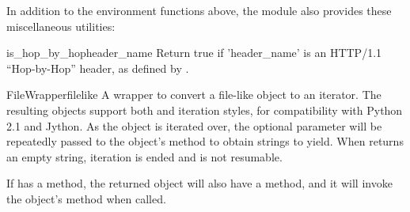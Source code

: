 In addition to the environment functions above, the
 module also provides these miscellaneous
utilities:

\begin{funcdesc}{is_hop_by_hop}{header_name}
Return true if 'header_name' is an HTTP/1.1 ``Hop-by-Hop'' header, as
defined by .
\end{funcdesc}

\begin{classdesc}{FileWrapper}{filelike }
A wrapper to convert a file-like object to an iterator.  The resulting
objects support both  and 
iteration styles, for compatibility with Python 2.1 and Jython.
As the object is iterated over, the optional  parameter
will be repeatedly passed to the  object's 
method to obtain strings to yield.  When  returns an
empty string, iteration is ended and is not resumable.

If  has a  method, the returned object
will also have a  method, and it will invoke the
 object's  method when called.
\end{classdesc}



















